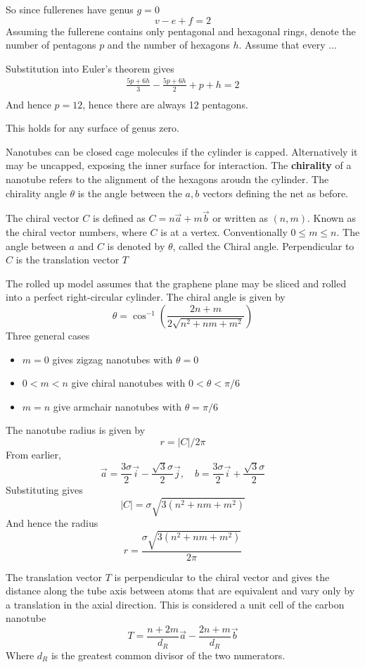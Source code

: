 \documentclass{E:/Documents/Latex/myassignment}
\begin{document}
So since fullerenes have genus $g=0$
\[v - e +f =2\]
Assuming the fullerene contains only pentagonal and hexagonal rings, denote the number of pentagons $p$ and the number of hexagons $h$. Assume that every
...

Substitution into Euler's theorem gives
\begin{align*}
	\frac{5p + 6h}{3} - \frac{5p + 6h}{2} + p + h = 2\\
\end{align*}
And hence $p=12$, hence there are always 12 pentagons.

This holds for any surface of genus zero.

Nanotubes can be closed cage molecules if the cylinder is capped. Alternatively it may be uncapped, exposing the inner surface for interaction.
The \textbf{chirality} of a nanotube refers to the alignment of the hexagons aroudn the cylinder.
The chirality angle $\theta$ is the angle between the $a,b$ vectors defining the net as before.

The chiral vector $C$ is defined as $C = n\vec a + m\vec b$ or written as $(n,m)$. Known as the chiral vector numbers, where $C$ is at a vertex.
Conventionally $0\leq m\leq n$.
The angle between $a$ and $C$ is denoted by $\theta$, called the Chiral angle.
Perpendicular to $C$ is the translation vector $T$

The rolled up model assumes that the graphene plane may be sliced and rolled into a perfect right-circular cylinder. The chiral angle is given by
\[\theta = \cos^{-1}\left(\frac{2n+m}{2\sqrt{n^2 + nm + m^2}}\right)\]
Three general cases
\begin{itemize}
	\item $m=0$ gives zigzag nanotubes with $\theta =0$
	\item $0<m<n$ give chiral nanotubes with $0<\theta<\pi/6$
	\item $m=n$ give armchair nanotubes with $\theta = \pi/6$
\end{itemize}
The nanotube radius is given by
\[r = |C|/2\pi\]
From earlier,
\[\vec a = \frac{3\sigma}{2} \vec i - \frac{\sqrt{3}\sigma}{2} \vec j , \quad b =\frac{3\sigma}{2} \vec i + \frac{\sqrt{3}\sigma}{2}  \]
Substituting gives
\[|C| = \sigma\sqrt{3(n^2+nm+m^2)}\]
And hence the radius
\[r = \frac{\sigma\sqrt{3(n^2+nm+m^2)}}{2\pi}\]

The translation vector $T$ is perpendicular to the chiral vector and gives the distance along the tube axis between atoms that are equivalent and vary only by a translation in the axial direction. This is considered a unit cell of the carbon nanotube
\[T = \frac{n+2m}{d_R} \vec a - \frac{2n +m}{d_R} \vec b\]
Where $d_R$ is the greatest common divisor of the two numerators.
\end{document}
